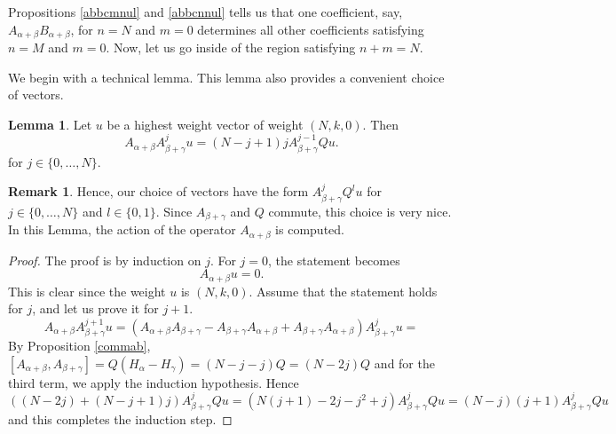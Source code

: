 \documentclass[twoside,a4paper,12pt]{article}
\theoremstyle{definition}
\newtheorem{remark}{Remark}
\newtheorem{lemma}{Lemma}
\begin{document}
Propositions \ref{abbcmnul} and \ref{abbcnnul} tells us that one coefficient,
say, $A_{\alpha+\beta}B_{\alpha+\beta}$, for $n=N$ and $m=0$ determines all
other coefficients satisfying $n=M$ and $m=0$. Now, let us go inside of the
region satisfying $n+m=N$.

We begin with a technical lemma. This lemma also provides a convenient choice of
vectors.

\begin{lemma}
	Let $u$ be a highest weight vector of weight $(N,k,0)$. Then
	\begin{equation}\label{npmbasis}
		A_{\alpha+\beta}A_{\beta+\gamma}^ju=(N-j+1)jA_{\beta+\gamma}^{j-1}Qu.
	\end{equation}
	for $j\in\{0,\ldots,N\}$.
\end{lemma}

\begin{remark}
	Hence, our choice of vectors have the form $A_{\beta+\gamma}^jQ^lu$ for
	$j\in\{0,\ldots,N\}$ and $l\in\{0,1\}$. Since $A_{\beta+\gamma}$ and $Q$
	commute, this choice is very nice. In this Lemma, the action of the
	operator $A_{\alpha+\beta}$ is computed.
\end{remark}

\begin{proof}
	The proof is by induction on $j$. For $j=0$, the statement becomes
	\begin{equation*}
		A_{\alpha+\beta}u=0.
	\end{equation*}
	This is clear since the weight $u$ is $(N,k,0)$.
	Assume that the statement holds for $j$, and let us prove it for $j+1$.
	\begin{equation*}
		A_{\alpha+\beta}A_{\beta+\gamma}^{j+1}u=
		(A_{\alpha+\beta}A_{\beta+\gamma}-A_{\beta+\gamma}A_{\alpha+\beta}
		+A_{\beta+\gamma}A_{\alpha+\beta})A_{\beta+\gamma}^ju=
	\end{equation*}
	By Proposition \ref{commab},
	$[A_{\alpha+\beta},A_{\beta+\gamma}]=Q(H_\alpha-H_\gamma)=(N-j-j)Q=(N-2j)Q$
	and for the third term, we apply the induction hypothesis. Hence
	\begin{equation*}
		((N-2j)+(N-j+1)j)A_{\beta+\gamma}^jQu=
		(N(j+1)-2j-j^2+j)A_{\beta+\gamma}^jQu=
		(N-j)(j+1)A_{\beta+\gamma}^jQu
	\end{equation*}
	and this completes the induction step.
\end{proof}
\end{document}
